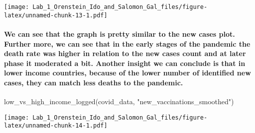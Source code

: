\documentclass[
]{article}
\newenvironment{Shaded}{\begin{snugshade}}{\end{snugshade}}
\newcommand{\FunctionTok}[1]{\textcolor[rgb]{0.00,0.00,0.00}{#1}}
\newcommand{\NormalTok}[1]{#1}
\newcommand{\StringTok}[1]{\textcolor[rgb]{0.31,0.60,0.02}{#1}}
\begin{document}
\texttt{[image: Lab\_1\_Orenstein\_Ido\_and\_Salomon\_Gal\_files/figure-latex/unnamed-chunk-13-1.pdf]}

\hypertarget{we-can-see-that-the-graph-is-pretty-similar-to-the-new-cases-plot.-further-more-we-can-see-that-in-the-early-stages-of-the-pandemic-the-death-rate-was-higher-in-relation-to-the-new-cases-count-and-at-later-phase-it-moderated-a-bit.-another-insight-we-can-conclude-is-that-in-lower-income-countries-because-of-the-lower-number-of-identified-new-cases-they-can-match-less-deaths-to-the-pandemic.}{%
\paragraph{We can see that the graph is pretty similar to the new cases
plot. Further more, we can see that in the early stages of the pandemic
the death rate was higher in relation to the new cases count and at
later phase it moderated a bit. Another insight we can conclude is that
in lower income countries, because of the lower number of identified new
cases, they can match less deaths to the
pandemic.}\label{we-can-see-that-the-graph-is-pretty-similar-to-the-new-cases-plot.-further-more-we-can-see-that-in-the-early-stages-of-the-pandemic-the-death-rate-was-higher-in-relation-to-the-new-cases-count-and-at-later-phase-it-moderated-a-bit.-another-insight-we-can-conclude-is-that-in-lower-income-countries-because-of-the-lower-number-of-identified-new-cases-they-can-match-less-deaths-to-the-pandemic.}}

\begin{Shaded}
\begin{Highlighting}[]
\FunctionTok{low\_vs\_high\_income\_logged}\NormalTok{(covid\_data, }\StringTok{"new\_vaccinations\_smoothed"}\NormalTok{)}
\end{Highlighting}
\end{Shaded}

\texttt{[image: Lab\_1\_Orenstein\_Ido\_and\_Salomon\_Gal\_files/figure-latex/unnamed-chunk-14-1.pdf]}
\end{document}

